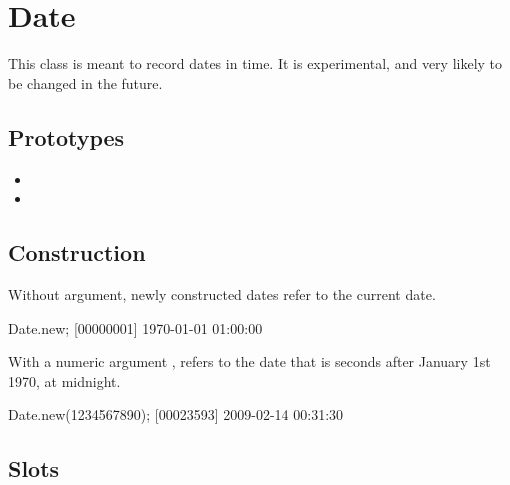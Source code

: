 \section{Date}

This class is meant to record dates in time.  It is experimental, and
very likely to be changed in the future.

\subsection{Prototypes}
\begin{itemize}
\item {}
\item {}
\end{itemize}

\subsection{Construction}

Without argument, newly constructed dates refer to the current date.

\begin{urbiscript}
Date.new;
[00000001] 1970-01-01 01:00:00
\end{urbiscript}

With a numeric argument , refers to the date that is 
seconds after January 1st 1970, at midnight.

\begin{urbiscript}[firstnumber=last]
Date.new(1234567890);
[00023593] 2009-02-14 00:31:30
\end{urbiscript}

\subsection{Slots}

